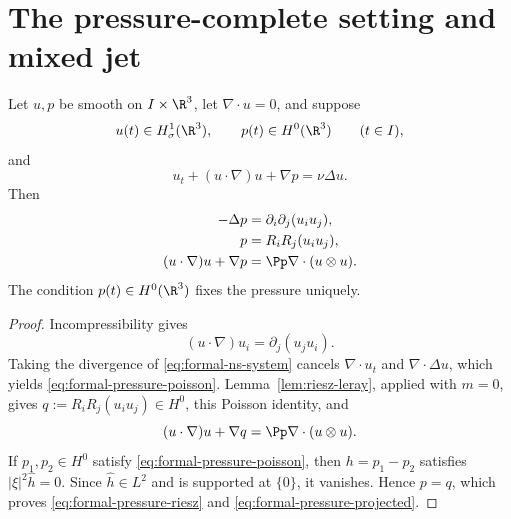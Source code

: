 \section{The pressure-complete setting and mixed jet}
\label{sec:formal-setting-mixed-jet}

\begin{proposition}
\label{prop:formal-pressure-normalization}
Let \(u,p\) be smooth on \(I\times\R^3\), let \(\nabla\cdot u=0\), and suppose
\[
 u(t)\in H^1_\sigma(\R^3),
 \qquad
 p(t)\in H^0(\R^3)
 \qquad(t\in I),
\]
and
\begin{equation}
 u_t+(u\cdot\nabla)u+\nabla p=\nu\Delta u.
 \label{eq:formal-ns-system}
\end{equation}
Then
\begin{align}
 -\Delta p
 &=\partial_i\partial_j(u_i u_j),
 \label{eq:formal-pressure-poisson}\\
 p
 &=R_iR_j(u_i u_j),
 \label{eq:formal-pressure-riesz}\\
 (u\cdot\nabla)u+\nabla p
 &=\Pp\nabla\cdot(u\otimes u).
 \label{eq:formal-pressure-projected}
\end{align}
The condition \(p(t)\in H^0(\R^3)\) fixes the pressure uniquely.
\end{proposition}

\begin{proof}
Incompressibility gives
\[
 (u\cdot\nabla)u_i=\partial_j(u_j u_i).
\]
Taking the divergence of \eqref{eq:formal-ns-system} cancels
\(\nabla\cdot u_t\) and \(\nabla\cdot\Delta u\), which yields
\eqref{eq:formal-pressure-poisson}.  Lemma~\ref{lem:riesz-leray}, applied
with \(m=0\), gives \(q:=R_iR_j(u_i u_j)\in H^0\), this Poisson identity, and
\[
 (u\cdot\nabla)u+\nabla q=\Pp\nabla\cdot(u\otimes u).
\]
If \(p_1,p_2\in H^0\) satisfy \eqref{eq:formal-pressure-poisson}, then
\(h=p_1-p_2\) satisfies
\(|\xi|^2\widehat h=0\).  Since \(\widehat h\in L^2\) and is supported at
\(\{0\}\), it vanishes.  Hence \(p=q\), which proves
\eqref{eq:formal-pressure-riesz} and \eqref{eq:formal-pressure-projected}.
\end{proof}

